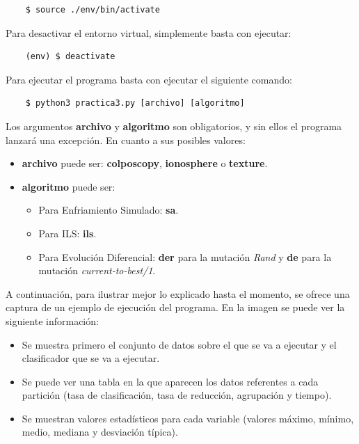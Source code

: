 \documentclass[11pt,a4paper]{article}
\begin{document}
\begin{lstlisting}
	$ source ./env/bin/activate
\end{lstlisting}

Para desactivar el entorno virtual, simplemente basta con ejecutar:

\begin{lstlisting}
	(env) $ deactivate
\end{lstlisting}

Para ejecutar el programa basta con ejecutar el siguiente comando:

\begin{lstlisting}
	$ python3 practica3.py [archivo] [algoritmo]
\end{lstlisting}

Los argumentos \textbf{archivo} y \textbf{algoritmo} son obligatorios, y sin ellos el programa lanzará una excepción. En
cuanto a sus posibles valores:

\begin{itemize}[label=\textbullet]
	\item \textbf{archivo} puede ser: \textbf{colposcopy}, \textbf{ionosphere} o \textbf{texture}.
	\item \textbf{algoritmo} puede ser:
	\begin{itemize}[label=$\ast$]
		\item Para Enfriamiento Simulado: \textbf{sa}.
		\item Para ILS: \textbf{ils}.
		\item Para Evolución Diferencial: \textbf{der} para la mutación \textit{Rand} y \textbf{de} para la mutación
		\textit{current-to-best/1}.
	\end{itemize}
\end{itemize}

A continuación, para ilustrar mejor lo explicado hasta el momento, se ofrece una captura de un ejemplo de ejecución del
programa. En la imagen se puede ver la siguiente información:

\begin{itemize}[label=\textbullet]
	\item Se muestra primero el conjunto de datos sobre el que se va a ejecutar y el clasificador que se va a ejecutar.
	\item Se puede ver una tabla en la que aparecen los datos referentes a cada partición (tasa de clasificación, tasa de
	reducción, agrupación y tiempo).
	\item Se muestran valores estadísticos para cada variable (valores máximo, mínimo, medio, mediana y desviación típica).
\end{itemize}
\end{document}
